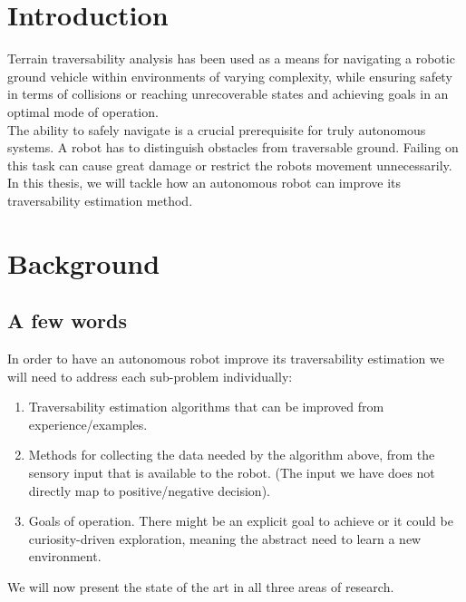 \documentclass[12pt,a4paper]{report}
\begin{document}
\chapter{Introduction}
\label{sec:intro}
	
	Terrain traversability analysis has been used as a means for navigating 
	a robotic ground vehicle within environments of varying complexity, while 
	ensuring safety in terms of collisions or reaching unrecoverable states and 
	achieving goals in an optimal mode of operation.
	\\
	
	The ability to safely navigate is a crucial prerequisite for truly 
	autonomous systems. A robot has to distinguish obstacles from traversable 
	ground. Failing on this	task can cause great damage or restrict the robots 
	movement unnecessarily.
	\\
	
	In this thesis, we will tackle how an autonomous robot can improve its 
	traversability estimation method.
	

\chapter{Background}
\label{sec:bg}


\section{A few words}
\label{sec:bg:into}
	
	In order to have an autonomous robot improve its traversability 
	estimation we will need to address each sub-problem individually:
        \begin{enumerate}
	\item Traversability estimation algorithms that can be
          improved from experience/examples.
	\item Methods for collecting the data needed by the algorithm
          above, from the sensory input that is available to the
          robot. (The input we have does not directly map to
          positive/negative decision).
	\item Goals of operation. There might be an explicit goal to
          achieve or it could be curiosity-driven exploration, meaning
          the abstract need to learn a new environment.
        \end{enumerate}
	
	We will now present the state of the art in all three areas of research.
	
\end{document}
